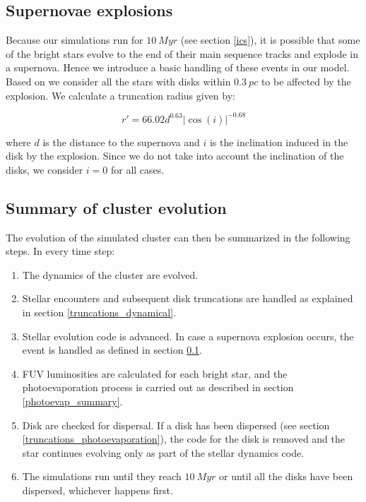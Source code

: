 \documentclass[fleqn,usenatbib]{mnras}
\begin{document}
\subsection{Supernovae explosions}\label{sn}
Because our simulations run for $\SI{10}{Myr}$ (see section \ref{ics}), it is possible that some of the bright stars evolve to the end of their main sequence tracks and explode in a supernova. Hence we introduce a basic handling of these events in our model. Based on \citet{portegieszwart2018} we consider all the stars with disks within $\SI{0.3}{pc}$ to be affected by the explosion. We calculate a truncation radius given by:

\begin{equation}\label{eq_sn}
    r' = 66.02 d^{0.63}  |\cos(i)|^{-0.68}
\end{equation}

\noindent
where $d$ is the distance to the supernova and $i$ is the inclination induced in the disk by the explosion. Since we do not take into account the inclination of the disks, we consider $i = 0$ for all cases.

\subsection{Summary of cluster evolution}
The evolution of the simulated cluster can then be summarized in the following steps. In every time step:

\begin{enumerate}
    \item The dynamics of the cluster are evolved.
    \item Stellar encounters and subsequent disk truncations are handled as explained in section \ref{truncations_dynamical}.
    \item Stellar evolution code is advanced. In case a supernova explosion occurs, the event is handled as defined in section \ref{sn}.
    \item FUV luminosities are calculated for each bright star, and the photoevaporation process is carried out as described in section \ref{photoevap_summary}.
    \item Disk are checked for dispersal. If a disk has been dispersed (see section \ref{truncations_photoevaporation}), the code for the disk is removed and the star continues evolving only as part of the stellar dynamics code.
    \item The simulations run until they reach $\SI{10}{Myr}$ or until all the disks have been dispersed, whichever happens first.
\end{enumerate}
\end{document}
